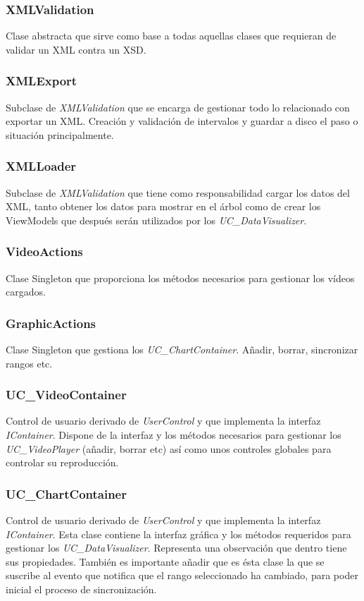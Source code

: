 \subsubsection{XMLValidation}
Clase abstracta que sirve como base a todas aquellas clases que requieran de validar un XML contra un XSD.

\subsubsection{XMLExport}
Subclase de \emph{XMLValidation} que se encarga de gestionar todo lo relacionado con exportar un XML. Creaci\'on y
validaci\'on de intervalos y guardar a disco el paso o situaci\'on principalmente.

\subsubsection{XMLLoader}
Subclase de \emph{XMLValidation} que tiene como responsabilidad cargar los datos del XML, tanto obtener los datos
para mostrar en el \'arbol como de crear los ViewModels que despu\'es ser\'an utilizados por los \emph{UC\_DataVisualizer}.

\subsubsection{VideoActions}
Clase Singleton que proporciona los m\'etodos necesarios para gestionar los v\'ideos cargados.

\subsubsection{GraphicActions}
Clase Singleton que gestiona los \emph{UC\_ChartContainer}. A\~nadir, borrar, sincronizar rangos etc.

\subsubsection{UC\_VideoContainer}
Control de usuario derivado de \emph{UserControl} y que implementa
la interfaz \emph{IContainer}. Dispone de la interfaz y los m\'etodos necesarios para
gestionar los \emph{UC\_VideoPlayer} (a\~nadir, borrar etc) as\'i como unos controles globales
para controlar su reproducci\'on.

\subsubsection{UC\_ChartContainer}
Control de usuario derivado de \emph{UserControl} y que implementa la interfaz
\emph{IContainer}. Esta clase contiene la interfaz gr\'afica y los m\'etodos requeridos para gestionar
los \emph{UC\_DataVisualizer}. Representa una observaci\'on que dentro tiene sus propiedades.
Tambi\'en es importante a\~nadir que es \'esta clase la que se suscribe al evento que notifica
que el rango seleccionado ha cambiado, para poder inicial el proceso de sincronizaci\'on.


